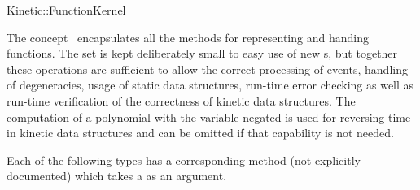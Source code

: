 

\begin{ccRefConcept}{Kinetic::FunctionKernel}


\ccDefinition
  
The concept \ccRefName\ encapsulates all the methods for representing
and handing functions. The set is kept deliberately small to easy use
of new \ccRefName s, but together these operations are sufficient to
allow the correct processing of events, handling of degeneracies,
usage of static data structures, run-time error checking as well as
run-time verification of the correctness of kinetic data structures.
The computation of a polynomial with the variable negated is used for
reversing time in kinetic data structures and can be omitted if that
capability is not needed.


\ccTypes






Each of the following types has a corresponding 
method (not explicitly documented) which takes a  as an
argument.



\end{ccRefConcept}
